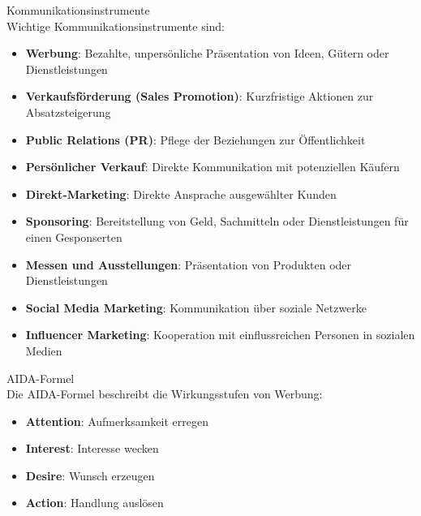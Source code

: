 \begin{definition}{Kommunikationsinstrumente}\\
Wichtige Kommunikationsinstrumente sind:
\begin{itemize}
    \item \textbf{Werbung}: Bezahlte, unpersönliche Präsentation von Ideen, Gütern oder Dienstleistungen
    \item \textbf{Verkaufsförderung (Sales Promotion)}: Kurzfristige Aktionen zur Absatzsteigerung
    \item \textbf{Public Relations (PR)}: Pflege der Beziehungen zur Öffentlichkeit
    \item \textbf{Persönlicher Verkauf}: Direkte Kommunikation mit potenziellen Käufern
    \item \textbf{Direkt-Marketing}: Direkte Ansprache ausgewählter Kunden
    \item \textbf{Sponsoring}: Bereitstellung von Geld, Sachmitteln oder Dienstleistungen für einen Gesponserten
    \item \textbf{Messen und Ausstellungen}: Präsentation von Produkten oder Dienstleistungen
    \item \textbf{Social Media Marketing}: Kommunikation über soziale Netzwerke
    \item \textbf{Influencer Marketing}: Kooperation mit einflussreichen Personen in sozialen Medien
\end{itemize}
\end{definition}

\begin{concept}{AIDA-Formel}\\
Die AIDA-Formel beschreibt die Wirkungsstufen von Werbung:
\begin{itemize}
    \item \textbf{Attention}: Aufmerksamkeit erregen
    \item \textbf{Interest}: Interesse wecken
    \item \textbf{Desire}: Wunsch erzeugen
    \item \textbf{Action}: Handlung auslösen
\end{itemize}
\end{concept}

